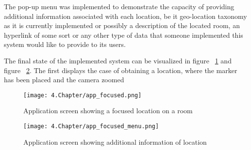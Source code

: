 The pop-up menu was implemented to demonstrate the capacity of providing additional information associated with each location, be it geo-location taxonomy as it is currently implemented or possibly a description of the located room, an hyperlink of some sort or any other type of data that someone implemented this system would like to provide to its users.  

The final state of the implemented system can be visualized in figure ~\ref{fig:AppFocus} and figure ~\ref{fig:AppMenu}. The first displays the case of obtaining a location, where the marker has been placed and the camera zoomed

\begin{figure}
	\centering
		\texttt{[image: 4.Chapter/app\_focused.png]}
	\caption[Application screen showing a focused location on a room]{Application screen showing a focused location on a room}
	\label{fig:AppFocus}
\end{figure}

\begin{figure}
	\centering
		\texttt{[image: 4.Chapter/app\_focused\_menu.png]}
	\caption[Application screen showing additional information of location]{Application screen showing additional information of location}
	\label{fig:AppMenu}
\end{figure}

